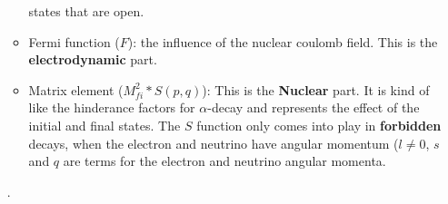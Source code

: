 \documentclass[letter]{article}
\begin{document}
\begin{itemize}
\begin{itemize}
  states that are open.
\item Fermi function ($F$): the influence of the nuclear coulomb
  field. This is the \textbf{electrodynamic} part.
\item Matrix element ($M_{fi}^2*S(p,q)$): This is the \textbf{Nuclear}
  part. It is kind of like the hinderance factors for $\alpha$-decay
  and represents the effect of the initial and final states. The $S$
  function only comes into play in \textbf{forbidden} decays, when the
  electron and neutrino have angular momentum ($l \neq 0$, $s$ and $q$
  are terms for the electron and neutrino angular momenta.
\end{itemize}
\cite[pp.281-282]{krane}.
\end{itemize}



\end{document}
